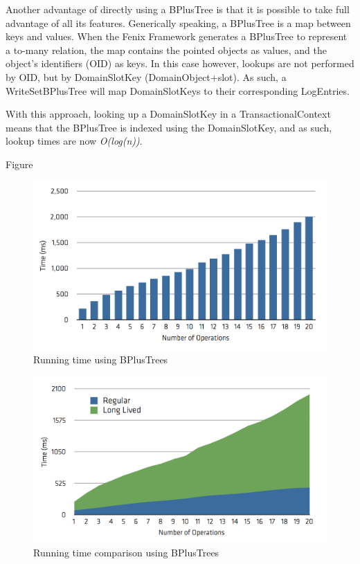 Another advantage of directly using a BPlusTree is that it is possible
to take full advantage of all its features. Generically speaking, a
BPlusTree is a map between keys and values. When the Fenix Framework
generates a BPlusTree to represent a to-many relation, the map
contains the pointed objects as values, and the object's identifiers
(OID) as keys. In this case however, lookups are not performed by OID,
but by DomainSlotKey (DomainObject+slot). As such, a WriteSetBPlusTree
will map DomainSlotKeys to their corresponding LogEntries.

With this approach, looking up a DomainSlotKey in a
TransactionalContext means that the BPlusTree is indexed using the
DomainSlotKey, and as such, lookup times are now {\it O(log(n))}.

Figure

\begin{figure}
\centering
\includegraphics[width=0.9\linewidth]{time-long-bplus}
\caption{Running time using BPlusTrees}
\label{fig:runtimeBPlus}
\end{figure}

\begin{figure}
\centering
\includegraphics[width=0.9\linewidth]{comparison-bplus}
\caption{Running time comparison using BPlusTrees}
\label{fig:comparisonBPlus}
\end{figure}

